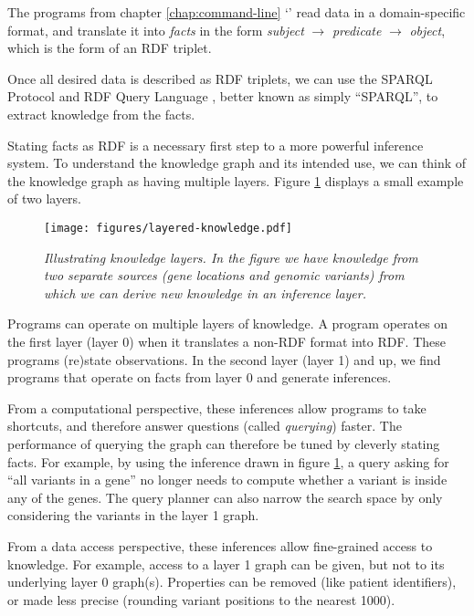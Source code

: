   The programs from chapter \ref{chap:command-line}
  {\color{LinkGray}`'} read data in a
  domain-specific format, and translate it into \emph{facts} in the form
  \emph{subject} $\rightarrow$ \emph{predicate} $\rightarrow$
  \emph{object}, which is the form of an RDF triplet.

  Once all desired data is described as RDF triplets, we can use the SPARQL
  Protocol and RDF Query Language \citep{sparql-11}, better known as simply
  ``SPARQL'', to extract knowledge from the facts.

  Stating facts as RDF is a necessary first step to a more powerful inference
  system.  To understand the knowledge graph and its intended use, we can
  think of the knowledge graph as having multiple layers.  Figure
  \ref{fig:layered-knowledge} displays a small example of two layers.

  \begin{figure}[h]
    \begin{center}
    \texttt{[image: figures/layered-knowledge.pdf]}
    \end{center}
    \caption{\textit{Illustrating knowledge layers.  In the figure we have
        knowledge from two separate sources (gene locations and genomic
        variants) from which we can derive new knowledge in an inference
        layer.}}
    \label{fig:layered-knowledge}
  \end{figure}

  Programs can operate on multiple layers of knowledge.  A program operates
  on the first layer (layer 0) when it translates a non-RDF format into RDF.
  These programs (re)state observations.  In the second layer (layer 1) and
  up, we find programs that operate on facts from layer 0 and generate
  inferences.

  From a computational perspective, these inferences allow programs to take
  shortcuts, and therefore answer questions (called \emph{querying}) faster.
  The performance of querying the graph can therefore be tuned by cleverly
  stating facts.  For example, by using the inference drawn in figure
  \ref{fig:layered-knowledge}, a query asking for ``all variants in a gene''
  no longer needs to compute whether a variant is inside any of the
  genes.  The query planner can also narrow the search space by only
  considering the variants in the layer 1 graph.

  From a data access perspective, these inferences allow fine-grained access
  to knowledge.  For example, access to a layer 1 graph can be given, but
  not to its underlying layer 0 graph(s).  Properties can be removed (like
  patient identifiers), or made less precise (rounding variant positions to
  the nearest 1000).


